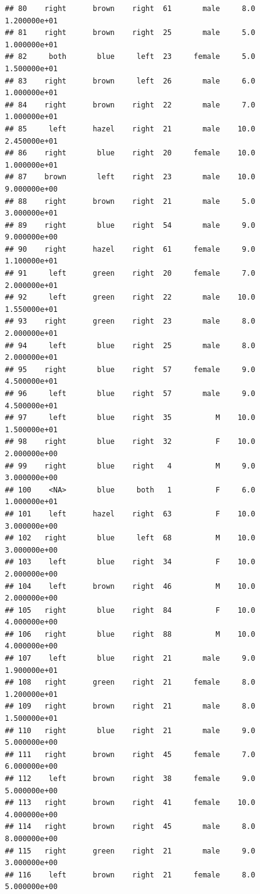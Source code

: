 \documentclass[]{article}
\begin{document}
\begin{verbatim}
## 80    right      brown    right  61       male     8.0  1.200000e+01
## 81    right      brown    right  25       male     5.0  1.000000e+01
## 82     both       blue     left  23     female     5.0  1.500000e+01
## 83    right      brown     left  26       male     6.0  1.000000e+01
## 84    right      brown    right  22       male     7.0  1.000000e+01
## 85     left      hazel    right  21       male    10.0  2.450000e+01
## 86    right       blue    right  20     female    10.0  1.000000e+01
## 87    brown       left    right  23       male    10.0  9.000000e+00
## 88    right      brown    right  21       male     5.0  3.000000e+01
## 89    right       blue    right  54       male     9.0  9.000000e+00
## 90    right      hazel    right  61     female     9.0  1.100000e+01
## 91     left      green    right  20     female     7.0  2.000000e+01
## 92     left      green    right  22       male    10.0  1.550000e+01
## 93    right      green    right  23       male     8.0  2.000000e+01
## 94     left       blue    right  25       male     8.0  2.000000e+01
## 95    right       blue    right  57     female     9.0  4.500000e+01
## 96     left       blue    right  57       male     9.0  4.500000e+01
## 97     left       blue    right  35          M    10.0  1.500000e+01
## 98    right       blue    right  32          F    10.0  2.000000e+00
## 99    right       blue    right   4          M     9.0  3.000000e+00
## 100    <NA>       blue     both   1          F     6.0  1.000000e+01
## 101    left      hazel    right  63          F    10.0  3.000000e+00
## 102   right       blue     left  68          M    10.0  3.000000e+00
## 103    left       blue    right  34          F    10.0  2.000000e+00
## 104    left      brown    right  46          M    10.0  2.000000e+00
## 105   right       blue    right  84          F    10.0  4.000000e+00
## 106   right       blue    right  88          M    10.0  4.000000e+00
## 107    left       blue    right  21       male     9.0  1.900000e+01
## 108   right      green    right  21     female     8.0  1.200000e+01
## 109   right      brown    right  21       male     8.0  1.500000e+01
## 110   right       blue    right  21       male     9.0  5.000000e+00
## 111   right      brown    right  45     female     7.0  6.000000e+00
## 112    left      brown    right  38     female     9.0  5.000000e+00
## 113   right      brown    right  41     female    10.0  4.000000e+00
## 114   right      brown    right  45       male     8.0  8.000000e+00
## 115   right      green    right  21       male     9.0  3.000000e+00
## 116    left      brown    right  21     female     8.0  5.000000e+00

\end{verbatim}
\end{document}
